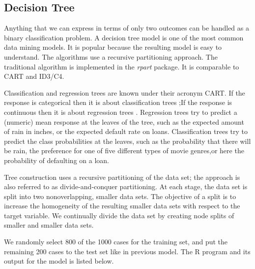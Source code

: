 \documentclass{article}\usepackage[]{graphicx}\usepackage[]{color}
\begin{document}
\subsection{Decision Tree} \hspace{0.9cm} Anything that we can express in terms of only two outcomes can be handled as a binary classification problem. A decision tree model is one of the most common data mining models. It
is popular because the resulting model is easy to understand. The algorithms use a recursive partitioning approach. The traditional algorithm is implemented in the \textit{rpart} package. It is comparable to CART and ID3/C4.\par
\hspace{0.5cm}Classification and regression trees are known under their acronym CART. If the response is categorical then it is about classification trees ;If the response is continuous then it is about regression trees . Regression trees try to predict a (numeric) mean response at the leaves of the tree, such as the expected amount of rain in inches, or the expected default rate on loans. Classification trees try to predict the class probabilities at the leaves, such as the probability that there will be rain, the
preference for one of five different types of movie genres,or here the probability of defaulting on a loan.\par
\hspace{0.5cm} Tree construction uses a recursive partitioning of the data set; the approach is also referred to as divide-and-conquer partitioning. At each stage, the data set is split into two nonoverlapping, smaller data sets. The objective of a split is to increase the homogeneity of the resulting smaller data sets with respect to the target variable. We continually divide the data set by creating node splits of smaller and smaller data sets\cite{[4]}.\par
\hspace{0.5cm}We randomly select 800 of the 1000 cases for the training set, and put the remaining 200 cases to the test set like in previous model. The R program and its output for the model is listed below.
\end{document}
